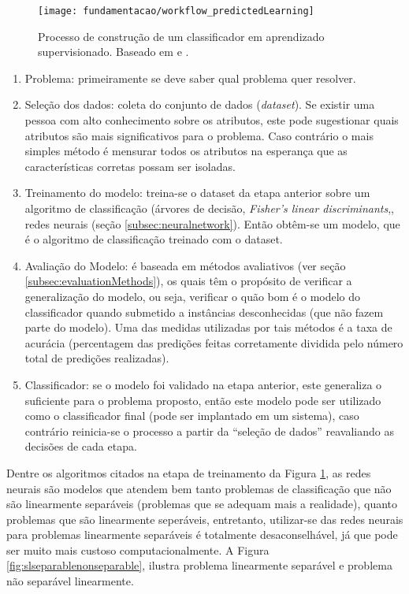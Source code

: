 \begin{figure}[!htb] \centering 
  \centering
  \texttt{[image: fundamentacao/workflow\_predictedLearning]} 
  \caption{Processo de construção de um classificador em aprendizado supervisionado. Baseado em \cite{Kotsiantis:2007} e .} 
  \label{fig:slclassification}
\end{figure}

\begin{enumerate}
\item Problema: primeiramente se deve saber qual problema quer resolver.
\item Seleção dos dados: coleta do conjunto de dados (\textit{dataset}). Se existir uma pessoa com alto conhecimento sobre os atributos, este pode sugestionar quais atributos são mais significativos para o problema. Caso contrário o mais simples método é mensurar todos os atributos na esperança que as características corretas possam ser isoladas.\cite{Kotsiantis:2007}
\item Treinamento do modelo: treina-se o dataset da etapa anterior sobre um algoritmo de classificação (árvores de decisão, \textit{Fisher’s linear discriminants},\cite{Michie:1994}, redes neurais (seção \ref{subsec:neuralnetwork}). Então obtêm-se um modelo, que é o algoritmo de classificação treinado com o dataset.
\item Avaliação do Modelo: é baseada em métodos avaliativos (ver seção \ref{subsec:evaluationMethods}), os quais têm o propósito de verificar a generalização do modelo, ou seja, verificar o quão bom é o modelo do classificador quando submetido a instâncias desconhecidas (que não fazem parte do modelo). Uma das medidas utilizadas por tais métodos é a taxa de acurácia (percentagem das predições feitas corretamente dividida pelo número total de predições realizadas).\cite{Kotsiantis:2007}
\item Classificador: se o modelo foi validado na etapa anterior, este generaliza o suficiente para o problema proposto, então este modelo pode ser utilizado como o classificador final (pode ser implantado em um sistema), caso contrário reinicia-se o processo a partir da ``seleção de dados'' reavaliando as decisões de cada etapa.
\end{enumerate}

Dentre os algoritmos citados na etapa de treinamento da Figura \ref{fig:slclassification}, as redes neurais são modelos que atendem bem tanto problemas de classificação que não são linearmente separáveis (problemas que se adequam mais a realidade), quanto problemas que são linearmente seperáveis, entretanto, utilizar-se das redes neurais para problemas linearmente separáveis é totalmente desaconselhável, já que pode ser muito mais custoso computacionalmente.\cite{Zhang:2000}\cite{Elizondo:2006} A Figura \ref{fig:slseparablenonseparable}, ilustra problema linearmente separável e problema não separável linearmente.

